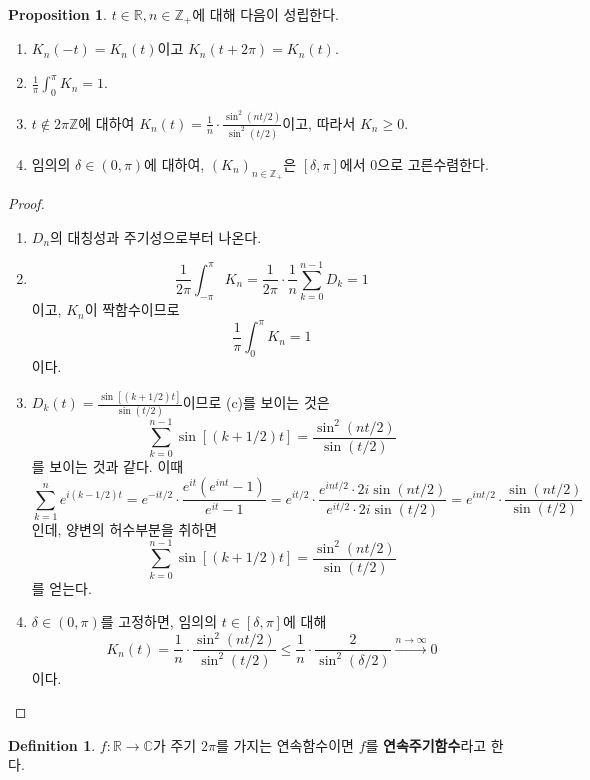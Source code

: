 \documentclass[11pt]{book}
\numberwithin{equation}{chapter}
\def\ZZ{\mathbb{Z}}
\def\RR{\mathbb{R}}
\def\CC{\mathbb{C}}
\theoremstyle{definition}
\newtheorem{prop}[thm]{Proposition}
\newtheorem{defn}[thm]{Definition}
\newenvironment{enum}
	{\begin{enumerate}[label=(\alph*), leftmargin=2\parindent]}
	{\end{enumerate}}
\begin{document}
\begin{prop} \label{15.2.7}
    \(t \in \RR, n \in \ZZ_+\)에 대해 다음이 성립한다.
    \begin{enum}
        \item \(K_n(-t) = K_n(t)\)이고 \(K_n(t+2\pi) = K_n(t)\).
        \item \(\displaystyle \frac{1}{\pi} \int_0^\pi K_n = 1\).
        \item  \(t \notin 2\pi\ZZ\)에 대하여 \(\displaystyle K_n(t) = \frac{1}{n} \cdot \frac{\sin^2(nt/2)}{\sin^2(t/2)}\)이고, 따라서 \(K_n \ge 0\).
        \item 임의의 \(\delta \in (0, \pi)\)에 대하여, \((K_n)_{n \in \ZZ_+}\)은 \([\delta, \pi]\)에서 0으로 고른수렴한다.
    \end{enum}
\end{prop}
\begin{proof}
    \quad

    \begin{enum}
        \item \(D_n\)의 대칭성과 주기성으로부터 나온다.
        \item
        \[
            \frac{1}{2\pi} \int_{-\pi}^\pi K_n = \frac{1}{2\pi} \cdot \frac{1}{n} \sum_{k=0}^{n-1} D_k = 1
        \]
        이고, \(K_n\)이 짝함수이므로
        \[
            \frac{1}{\pi} \int_0^\pi K_n = 1
        \]
        이다.
        \item \(\displaystyle D_k(t) = \frac{\sin [(k + 1/2)t]}{\sin (t/2)}\)이므로 (c)를 보이는 것은
        \[
            \sum_{k=0}^{n-1} \sin [(k + 1/2)t] = \frac{\sin^2(nt/2)}{\sin(t/2)}
        \]
        를 보이는 것과 같다. 이때
        \[
            \sum_{k=1}^{n} e^{i(k-1/2)t} = e^{-it/2} \cdot \frac{e^{it}(e^{int} - 1)}{e^{it}-1} = e^{it/2} \cdot \frac{e^{int/2} \cdot 2i \sin(nt/2)}{e^{it/2} \cdot 2i \sin(t/2)} = e^{int/2} \cdot \frac{\sin(nt/2)}{\sin(t/2)}
        \]
        인데, 양변의 허수부분을 취하면
        \[
            \sum_{k=0}^{n-1} \sin [(k + 1/2)t] = \frac{\sin^2(nt/2)}{\sin(t/2)}
        \]
        를 얻는다.
        \item \(\delta \in (0, \pi)\)를 고정하면, 임의의 \(t \in [\delta, \pi]\)에 대해
        \[
            K_n(t) = \frac{1}{n} \cdot \frac{\sin^2(nt/2)}{\sin^2(t/2)} \le \frac{1}{n} \cdot \frac{2}{\sin^2(\delta/2)} \xrightarrow[]{n \to \infty} 0
        \]
        이다.
    \end{enum}
\end{proof}

\begin{defn}
    \(f : \RR \to \CC\)가 주기 \(2\pi\)를 가지는 연속함수이면 \(f\)를 \textbf{연속주기함수}라고 한다.
\end{defn}
\end{document}
